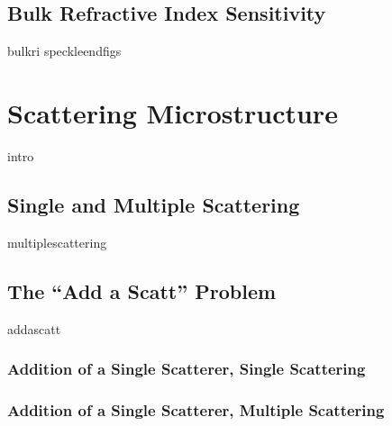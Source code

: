 \documentclass[12pt,a4paper,titlepage,onecolumn]{report}
\begin{document}
\section{Bulk Refractive Index Sensitivity}\label{sec:bulkri}
{bulkri}
\newpage
{speckleendfigs}

\chapter{Scattering Microstructure}\label{ch:scatteringmicro}
{intro}
\section{Single and Multiple Scattering}
{multiplescattering}
\section{The ``Add a Scatt'' Problem}
{addascatt}
\subsection{Addition of a Single Scatterer, Single Scattering}
\subsection{Addition of a Single Scatterer, Multiple Scattering}
\end{document}

